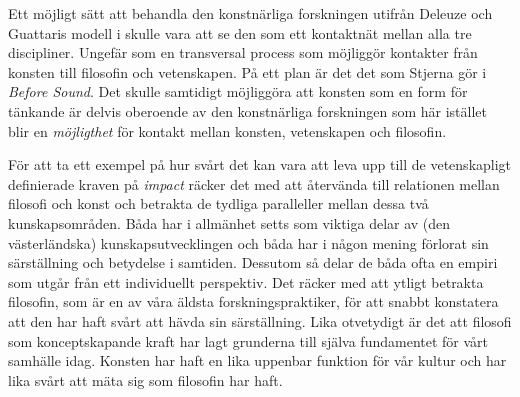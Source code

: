 \documentclass[11pt]{article}
\begin{document}
Ett möjligt sätt att behandla den konstnärliga forskningen utifrån
Deleuze och Guattaris modell i skulle vara att se den som ett kontaktnät
mellan alla tre discipliner. Ungefär som en transversal process som
möjliggör kontakter från konsten till filosofin och vetenskapen. På ett
plan är det det som Stjerna gör i \emph{Before Sound}. Det skulle samtidigt
möjliggöra att konsten som en form för tänkande är delvis oberoende av
den konstnärliga forskningen som här istället blir en \emph{möjligthet} för
kontakt mellan konsten, vetenskapen och filosofin.

För att ta ett exempel på hur svårt det kan vara att leva upp till de
vetenskapligt definierade kraven på \emph{impact} räcker det med att
återvända till relationen mellan filosofi och konst och betrakta de
tydliga paralleller mellan dessa två kunskapsområden. Båda har i
allmänhet setts som viktiga delar av (den västerländska)
kunskapsutvecklingen och båda har i någon mening förlorat sin
särställning och betydelse i samtiden. Dessutom så delar de båda ofta en
empiri som utgår från ett individuellt perspektiv. Det räcker med att
ytligt betrakta filosofin, som är en av våra äldsta forskningspraktiker,
för att snabbt konstatera att den har haft svårt att hävda sin
särställning. Lika otvetydigt är det att filosofi som konceptskapande
kraft har lagt grunderna till själva fundamentet för vårt samhälle idag.
Konsten har haft en lika uppenbar funktion för vår kultur och har lika
svårt att mäta sig som filosofin har haft.
\end{document}
